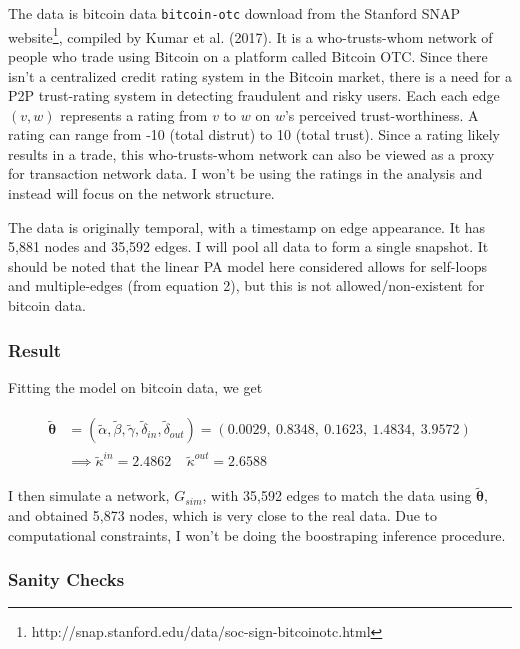 \documentclass[]{elsarticle} %
\begin{document}
The data is bitcoin data \texttt{bitcoin-otc} download from the Stanford
SNAP website\footnote{http://snap.stanford.edu/data/soc-sign-bitcoinotc.html},
compiled by Kumar et al. (2017). It is a who-trusts-whom network of
people who trade using Bitcoin on a platform called Bitcoin OTC. Since
there isn't a centralized credit rating system in the Bitcoin market,
there is a need for a P2P trust-rating system in detecting fraudulent
and risky users. Each each edge \((v,w)\) represents a rating from \(v\)
to \(w\) on \(w\)'s perceived trust-worthiness. A rating can range from
-10 (total distrut) to 10 (total trust). Since a rating likely results
in a trade, this who-trusts-whom network can also be viewed as a proxy
for transaction network data. I won't be using the ratings in the
analysis and instead will focus on the network structure.

The data is originally temporal, with a timestamp on edge appearance. It
has 5,881 nodes and 35,592 edges. I will pool all data to form a single
snapshot. It should be noted that the linear PA model here considered
allows for self-loops and multiple-edges (from equation 2), but this is
not allowed/non-existent for bitcoin data.

\subsubsection{Result}\label{result}

Fitting the model on bitcoin data, we get

\begin{align}
\begin{split}
\boldsymbol{\tilde{\theta}} &= (\tilde{\alpha}, \tilde{\beta}, \tilde{\gamma}, \tilde{\delta}_{in},  \tilde{\delta}_{out} ) = (0.0029, \ 0.8348, \ 0.1623, \ 1.4834, \ 3.9572) \\
&\implies \tilde{\kappa}^{in} = 2.4862 \ \ \ \ \ \tilde{\kappa}^{out} = 2.6588
\end{split}
\end{align}

\noindent I then simulate a network, \(G_{sim}\), with 35,592 edges to
match the data using \(\boldsymbol{\tilde{\theta}}\), and obtained 5,873
nodes, which is very close to the real data. Due to computational
constraints, I won't be doing the boostraping inference procedure.

\subsubsection{Sanity Checks}\label{sanity-checks}
\end{document}
